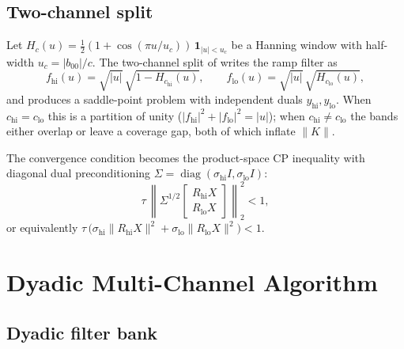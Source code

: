 \documentclass{article}
\newcommand{\diag}{\operatorname{diag}}
\newcommand{\ind}{\mathbf{1}}
\begin{document}
\subsection{Two-channel split}

Let $H_c(u) = \tfrac12 (1 + \cos(\pi u/u_c))\, \ind_{|u|<u_c}$ be a
Hanning window with half-width $u_c = |b_{00}|/c$. The two-channel
split of \citet{sidky2014} writes the ramp filter as
\begin{equation}\label{eq:two-channel-filters}
  f_\text{hi}(u) = \sqrt{|u|}\,\sqrt{1 - H_{c_\text{hi}}(u)},
  \qquad
  f_\text{lo}(u) = \sqrt{|u|}\,\sqrt{H_{c_\text{lo}}(u)},
\end{equation}
and produces a saddle-point problem with independent duals
$y_\text{hi}, y_\text{lo}$. When $c_\text{hi} = c_\text{lo}$ this is a
partition of unity ($|f_\text{hi}|^2 + |f_\text{lo}|^2 = |u|$); when
$c_\text{hi} \neq c_\text{lo}$ the bands either overlap or leave a
coverage gap, both of which inflate $\|K\|$.

The convergence condition becomes the product-space CP inequality with
diagonal dual preconditioning $\Sigma = \diag(\sigma_\text{hi} I, \sigma_\text{lo} I)$:
\begin{equation}\label{eq:two-cond}
  \tau\, \left\|\Sigma^{1/2}
    \begin{bmatrix} R_\text{hi} X \\ R_\text{lo} X \end{bmatrix}
    \right\|_2^2 < 1,
\end{equation}
or equivalently $\tau\, \big(\sigma_\text{hi}\|R_\text{hi}X\|^2
+ \sigma_\text{lo}\|R_\text{lo}X\|^2\big) < 1$.

\section{Dyadic Multi-Channel Algorithm}

\subsection{Dyadic filter bank}\label{sec:dyadic-bank}
\end{document}
